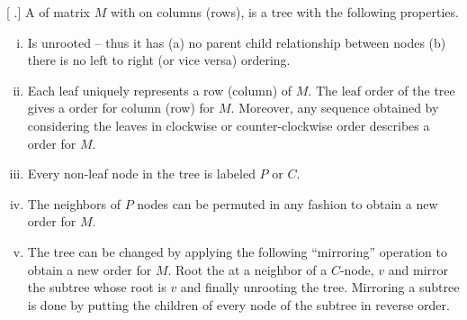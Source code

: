 \begin{definition}
  \label{def:pctree}
  [\emph{\PCtree} \cite{wlh01,d08phd}.]  A \PCtree of matrix $M$ with
  \CROP on columns (rows), is a tree with the following properties.
  \begin{enumerate}[i.]
    \singlespacing
  \item Is unrooted -- thus it has (a) no parent child relationship
    between nodes (b) there is no left to right (or vice versa)
    ordering.
  \item Each leaf uniquely represents a row (column) of $M$. The leaf
    order of the tree gives a \CROP order for column (row) for
    $M$. Moreover, any sequence obtained by considering the leaves in
    clockwise or counter-clockwise order describes a \CROP order for
    $M$.
  \item Every non-leaf node in the tree is labeled $P$ or $C$.
  \item The neighbors of $P$ nodes can be permuted in any fashion to
    obtain a new \CROP order for $M$.
  \item \label{def::pcmirror} The tree can be changed by applying the following
    ``mirroring'' operation to obtain a new \CROP order for $M$. Root
    the \PCtree at a neighbor of a $C$-node, $v$ and mirror the
    subtree whose root is $v$ and finally unrooting the
    tree. Mirroring a subtree is done by putting the children of every
    node of the subtree in reverse order.
  \end{enumerate}
\end{definition}

